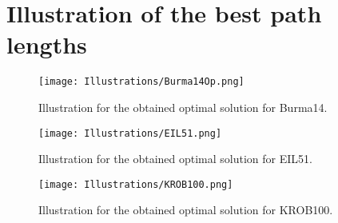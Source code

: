 \chapter{Illustration of the best path lengths}
\label{chap:appendix2}

\begin{figure}[H]
	\caption{Illustration for the obtained optimal solution for Burma14.}
	\texttt{[image: Illustrations/Burma14Op.png]}
	\centering
	\label{fig:Burma14Path}
\end{figure}

\begin{figure}[H]
	\caption{Illustration for the obtained optimal solution for EIL51.}
	\texttt{[image: Illustrations/EIL51.png]}
	\centering
	\label{fig:EIL51Path}
\end{figure}

\begin{figure}[H]
	\caption{Illustration for the obtained optimal solution for KROB100.}
	\texttt{[image: Illustrations/KROB100.png]}
	\centering
	\label{fig:KROB100Path}
\end{figure}